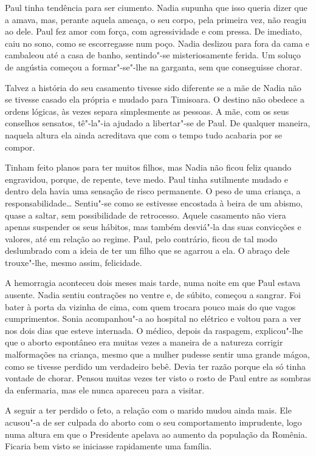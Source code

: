 Paul tinha tendência para ser ciumento. Nadia
supunha que isso queria dizer que a amava, mas, perante aquela ameaça, o
seu corpo, pela primeira vez, não reagiu ao dele. Paul fez amor com
força, com agressividade e com pressa. De imediato, caiu no sono, como
se escorregasse num poço. Nadia deslizou para fora da cama e cambaleou
até a casa de banho, sentindo"-se misteriosamente ferida. Um soluço de
angústia começou a formar"-se"-lhe na garganta,
sem que conseguisse chorar.

Talvez a história do seu casamento tivesse sido diferente se a mãe de
Nadia não se tivesse casado ela própria e mudado para Timisoara. O
destino não obedece a ordens lógicas, às vezes separa simplesmente as
pessoas. A mãe, com os seus conselhos sensatos, tê"-la"-ia ajudado a
libertar"-se de Paul. De qualquer maneira, naquela altura ela ainda acreditava
que com o tempo tudo acabaria por se compor.

Tinham feito planos para ter muitos filhos, mas Nadia não ficou feliz
quando engravidou, porque, de repente, teve medo. Paul tinha sutilmente
mudado e dentro dela havia uma sensação de risco permanente. O peso de
uma criança, a responsabilidade\ldots{} Sentiu"-se como se estivesse
encostada à beira de um abismo, quase a saltar, sem possibilidade de
retrocesso. Aquele casamento não viera apenas suspender os seus
hábitos, mas também desviá"-la das suas convicções e valores, até em
relação ao regime. Paul, pelo contrário, ficou de tal modo deslumbrado
com a ideia de ter um filho que se agarrou a ela. O abraço dele trouxe"-lhe, mesmo assim, felicidade.

A hemorragia aconteceu dois meses mais tarde, numa noite em que Paul
estava ausente. Nadia sentiu contrações no ventre e, de súbito,
começou a sangrar. Foi bater à porta da vizinha de cima, com quem
trocara pouco mais do que vagos cumprimentos. Sonia acompanhou"-a ao
hospital no elétrico e voltou para a ver nos dois dias que esteve
internada. O médico, depois da raspagem, explicou"-lhe que o aborto
espontâneo era muitas vezes a maneira de a natureza corrigir
malformações na criança, mesmo que a mulher pudesse sentir uma grande
mágoa, como se tivesse perdido um verdadeiro bebê. Devia ter razão
porque ela só tinha vontade de chorar. Pensou muitas vezes ter visto o
rosto de Paul entre as sombras da enfermaria, mas ele nunca apareceu
para a visitar.

A seguir a ter perdido o feto, a relação com o marido
mudou ainda mais. Ele acusou"-a de ser culpada do aborto com o seu
comportamento imprudente, logo numa altura em que o Presidente apelava
ao aumento da população
da Romênia. Ficaria bem visto se iniciasse rapidamente uma família.

